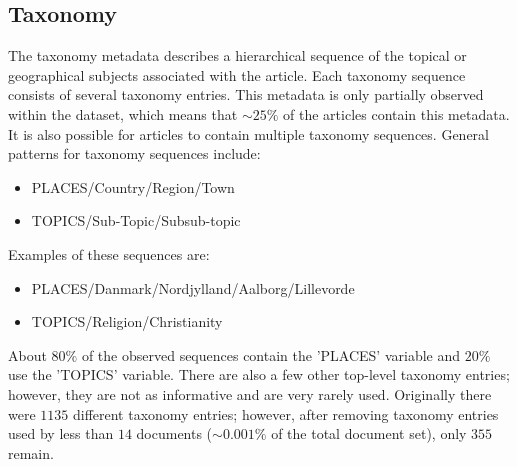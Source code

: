 \subsection{Taxonomy}\label{sec:dataset_taxonomy}
The taxonomy metadata describes a hierarchical sequence of the topical or geographical subjects associated with the article.
Each taxonomy sequence consists of several taxonomy entries.
This metadata is only partially observed within the dataset, which means that ${\sim}25\%$ of the articles contain this metadata.
It is also possible for articles to contain multiple taxonomy sequences.
General patterns for taxonomy sequences include:
\begin{itemize}
	\item PLACES/Country/Region/Town
	\item TOPICS/Sub-Topic/Subsub-topic
\end{itemize}
Examples of these sequences are:
\begin{itemize}
	\item PLACES/Danmark/Nordjylland/Aalborg/Lillevorde
	\item TOPICS/Religion/Christianity
\end{itemize}
About $80\%$ of the observed sequences contain the 'PLACES' variable and $20\%$ use the 'TOPICS' variable.
There are also a few other top-level taxonomy entries; however, they are not as informative and are very rarely used.
Originally there were $1135$ different taxonomy entries; however, after removing taxonomy entries used by less than $14$ documents (${\sim}0.001\%$ of the total document set), only $355$ remain.
